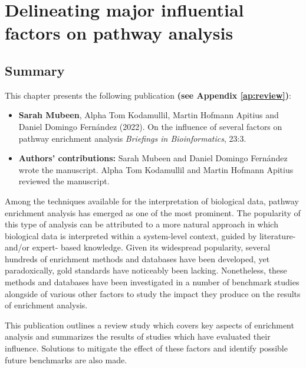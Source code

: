 \chapter{Delineating major influential factors on pathway analysis}

\label{ch:review}

\section*{Summary}

This chapter presents the following publication \textbf{(see Appendix \ref{ap:review})}:

\begin{itemize}

\item[] \textbf{Sarah Mubeen}, Alpha Tom Kodamullil, Martin Hofmann Apitius and Daniel Domingo Fernández (2022). On the influence of several factors on pathway enrichment analysis  \textit{Briefings in Bioinformatics}, 23:3.

\item[] \textbf{Authors' contributions:} Sarah Mubeen and Daniel Domingo Fernández wrote the manuscript. Alpha Tom Kodamullil and Martin Hofmann Apitius reviewed the manuscript.

\end{itemize}

\noindent
Among the techniques available for the interpretation of biological data, pathway enrichment analysis has emerged as one of the most prominent. The popularity of this type of analysis can be attributed to a more natural approach in which biological data is interpreted within a system-level context, guided by literature- and/or expert- based knowledge. Given its widespread popularity, several hundreds of enrichment methods and databases have been developed, yet paradoxically, gold standards have noticeably been lacking. Nonetheless, these methods and databases have been investigated in a number of benchmark studies alongside of various other factors to study the impact they produce on the results of enrichment analysis. 

This publication outlines a review study which covers key aspects of enrichment analysis and summarizes the results of studies which have evaluated their influence. Solutions to mitigate the effect of these factors and identify possible future benchmarks are also made.

